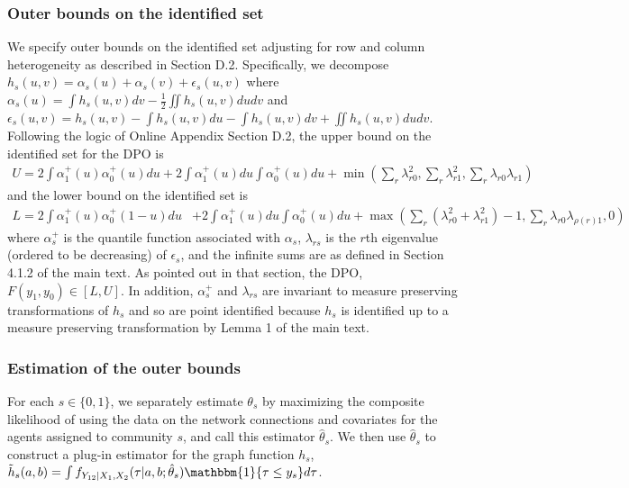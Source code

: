 \documentclass[12pt]{article}
\theoremstyle{definition}
\begin{document}
{\subsubsection{Outer bounds on the identified set}
We specify outer bounds on the identified set adjusting for row and column heterogeneity as described in Section D.2. Specifically, we decompose $h_{s}(u,v) = \alpha_{s}(u) + \alpha_{s}(v) + \epsilon_{s}(u,v)$ where $\alpha_{s}(u) = \int h_s(u,v)dv - \frac{1}{2}\iint h_s(u,v)dudv$ and $\epsilon_s(u,v) = h_s(u,v) - \int h_s(u,v)du - \int h_s(u,v)dv  + \iint h_s(u,v)dudv$. Following the logic of Online Appendix Section D.2, the upper bound on the identified set for the DPO is   
\begin{align*}
U = 2\int\alpha_{1}^{+}(u)\alpha_{0}^{+}(u)du + 2\int\alpha_{1}^{+}(u)du\int\alpha_{0}^{+}(u)du + \min\left(\sum_{r}\lambda_{r0}^{2}, \sum_{r}\lambda_{r1}^{2}, \sum_{r}\lambda_{r0}\lambda_{r1}\right)
\end{align*}
and the lower bound on the identified set is  
\begin{align*}
L = 2\int\alpha_{1}^{+}(u)\alpha_{0}^{+}(1-u)du &+ 2\int\alpha_{1}^{+}(u)du\int\alpha_{0}^{+}(u)du + \max\left(\sum_{r}\left(\lambda_{r0}^{2} +\lambda_{r1}^{2}\right) - 1, \sum_{r}\lambda_{r0}\lambda_{\rho(r)1},0\right) 
\end{align*}
where $\alpha^{+}_s$ is the quantile function associated with $\alpha_s$, $\lambda_{rs}$ is the $r$th eigenvalue  (ordered to be decreasing) of $\epsilon_s$, and the infinite sums are as defined in Section 4.1.2 of the main text. As pointed out in that section, the DPO, $F(y_1,y_0) \in [L,U]$. In addition, $\alpha_s^+$ and $\lambda_{rs}$ are invariant to measure preserving transformations of $h_s$ and so are point identified because $h_s$ is identified up to a measure preserving transformation by Lemma 1 of the main text.    



\subsubsection{Estimation of the outer bounds}
For each $s \in \{0,1\}$, we separately estimate $\theta_s$ by maximizing the composite likelihood of \cite{graham2020network} using the data on the network connections and covariates for the agents assigned to community $s$, and call this estimator $\hat{\theta}_s$. We then use $\hat{\theta}_s$ to construct a plug-in estimator for the graph function $h_s$, $\tilde{h}_s(a,b) = \int f_{Y_{12}|X_1,X_2}(\tau | a,b;\hat{\theta}_s)\mathbbm{1}\{\tau \leq y_s\}d\tau$.  

}
\end{document}

